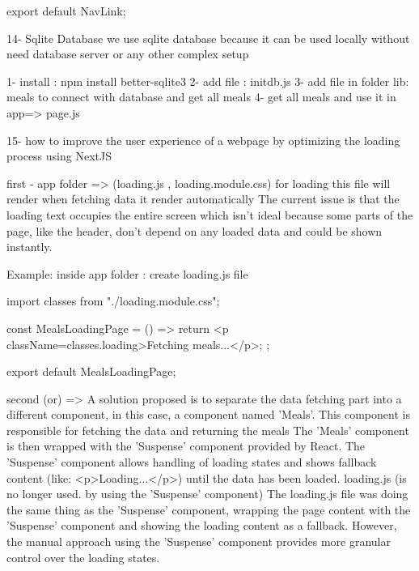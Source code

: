                         export default NavLink;


14- Sqlite Database
    we use sqlite database because it can be used locally without need database server or any other complex setup

    1- install : npm install better-sqlite3
    2- add file : initdb.js
    3- add file in folder lib: meals to connect with database and get all meals
    4- get all meals and use it in app=> page.js 


15-  how to improve the user experience of a webpage
     by optimizing the loading process using NextJS

        first    - app folder => (loading.js , loading.module.css) for loading 
                    this file will render when fetching data it render automatically
                    The current issue is that the loading text occupies the entire screen
                    which isn't ideal because some parts of the page,
                    like the header, don't depend on any loaded data and could be shown instantly.

                Example: 
                    inside app folder : create loading.js file 

                        import classes from "./loading.module.css";

                        const MealsLoadingPage = () => {
                        return <p className={classes.loading}>Fetching meals...</p>;
                        };

                        export default MealsLoadingPage;


      second  (or) => 
                    A solution proposed is to separate the data fetching part into a different component,
                    in this case, a component named 'Meals'.
                    This component is responsible for fetching the data and returning the meals 
                    The 'Meals' component is then wrapped with the 'Suspense' component provided by React.
                    The 'Suspense' component allows handling of loading states and shows fallback content (like: <p>Loading...</p>) until the data has been loaded.
                    loading.js (is no longer used. by using the 'Suspense' component)
                    The loading.js file was doing the same thing as the 'Suspense' component, wrapping the page content with the 'Suspense' component and showing the loading content as a fallback.
                    However, the manual approach using the 'Suspense' component provides more granular control over the loading states.

